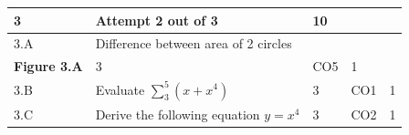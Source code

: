\documentclass[12pt]{article}
\begin{document}
		

	
	
	\begin{longtable}{|L{1cm}|L{8cm}|C{1cm}|C{1cm}|C{1cm}|}\hline
			\bf3 & \bf{Attempt} \bf2 out of \bf3 & \bf10 & & \\ \hline
				3.A &
	Difference between area of 2 circles \newline
		\begin{center}
		\includegraphics[width=4cm,height=3cm]{media/diagrams/diagram.png}\\\bf{Figure }\bf3.A	
	\end{center}

	
		 &  3 & CO5 & 1\\ \hline
		3.B &
	Evaluate $\displaystyle \sum_{3}^{5}(x+x^{4})$ \newline
		 &  3 & CO1 & 1\\ \hline
		3.C &
	Derive the following equation $y=x^{4}$ \newline
		 &  3 & CO2 & 1\\ \hline
		\end{longtable}

	
	


	
	
		
	
\end{document}

